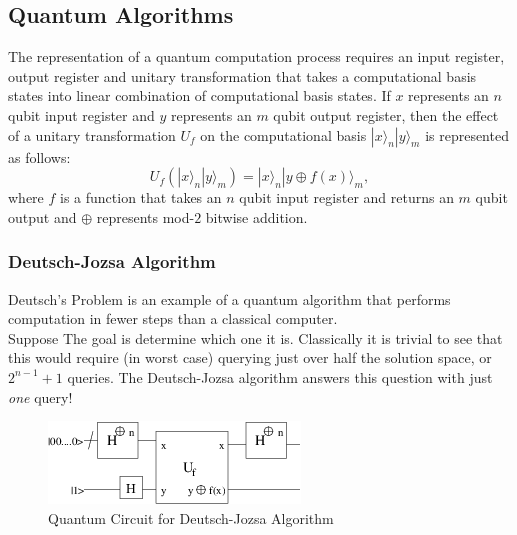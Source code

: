 \documentclass[11pt]{article}
\newcommand{\ket}[1]{|#1\rangle}
\begin{document}
\subsection{Quantum Algorithms}
  The representation of a quantum computation process requires an input register, output register and unitary transformation that takes a computational basis states into linear combination of computational basis states. If $x$ represents an $n$ qubit input register and $y$ represents an $m$ qubit output register, then the effect of a unitary transformation $U_f$ on the computational basis $\ket{x}_n\ket{y}_m$ is represented as follows:
	\begin{equation}
	U_f(\ket{x}_n\ket{y}_m)=\ket{x}_n\ket{y\oplus f(x)}_m,
	\end{equation}
	where $f$ is a function that takes an $n$ qubit input register and returns an $m$ qubit output and $\oplus$ represents mod-$2$ bitwise addition.
 \subsubsection{Deutsch-Jozsa Algorithm}
 Deutsch's Problem is an example of a quantum algorithm that performs computation in fewer steps than a classical computer.\\
 Suppose   The goal is determine which one it is.  Classically it is trivial to see that this would require (in worst case) querying just over half the solution space, or $2^{n-1} + 1$ queries.  The Deutsch-Jozsa algorithm answers this question with just {\it one} query!
 
\begin{figure}
\begin{center}
  \includegraphics{deutschjozsa}
\end{center}
\caption{Quantum Circuit for Deutsch-Jozsa Algorithm\label{m42}}
\end{figure}
\end{document}
